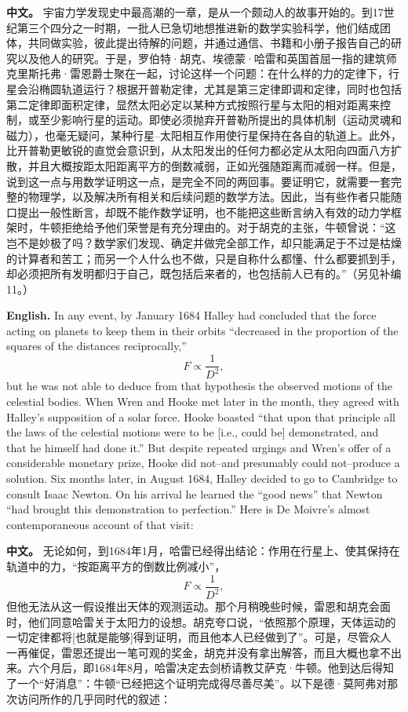 \par\noindent\textbf{中文。} 宇宙力学发现史中最高潮的一章，是从一个颇动人的故事开始的。到17世纪第三个四分之一时期，一批人已急切地想推进新的数学实验科学，他们结成团体，共同做实验，彼此提出待解的问题，并通过通信、书籍和小册子报告自己的研究以及他人的研究。于是，罗伯特·胡克、埃德蒙·哈雷和英国首屈一指的建筑师克里斯托弗·雷恩爵士聚在一起，讨论这样一个问题：在什么样的力的定律下，行星会沿椭圆轨道运行？根据开普勒定律，尤其是第三定律即调和定律，同时也包括第二定律即面积定律，显然太阳必定以某种方式按照行星与太阳的相对距离来控制，或至少影响行星的运动。即使必须抛弃开普勒所提出的具体机制（运动灵魂和磁力），也毫无疑问，某种行星--太阳相互作用使行星保持在各自的轨道上。此外，比开普勒更敏锐的直觉会意识到，从太阳发出的任何力都必定从太阳向四面八方扩散，并且大概按距太阳距离平方的倒数减弱，正如光强随距离而减弱一样。但是，说到这一点与用数学证明这一点，是完全不同的两回事。要证明它，就需要一套完整的物理学，以及解决所有相关和后续问题的数学方法。因此，当有些作者只能随口提出一般性断言，却既不能作数学证明，也不能把这些断言纳入有效的动力学框架时，牛顿拒绝给予他们荣誉是有充分理由的。对于胡克的主张，牛顿曾说：“这岂不是妙极了吗？数学家们发现、确定并做完全部工作，却只能满足于不过是枯燥的计算者和苦工；而另一个人什么也不做，只是自称什么都懂、什么都要抓到手，却必须把所有发明都归于自己，既包括后来者的，也包括前人已有的。”（另见补编11。）
\medskip

\noindent\textbf{English.} In any event, by January 1684 Halley had concluded that the force acting on planets to keep them in their orbits ``decreased in the proportion of the squares of the distances reciprocally,''
\[
F \propto \frac{1}{D^{2}},
\]
but he was not able to deduce from that hypothesis the observed motions of the celestial bodies. When Wren and Hooke met later in the month, they agreed with Halley's supposition of a solar force. Hooke boasted ``that upon that principle all the laws of the celestial motions were to be [i.e., could be] demonstrated, and that he himself had done it.'' But despite repeated urgings and Wren's offer of a considerable monetary prize, Hooke did not--and presumably could not--produce a solution. Six months later, in August 1684, Halley decided to go to Cambridge to consult Isaac Newton. On his arrival he learned the ``good news'' that Newton ``had brought this demonstration to perfection.'' Here is De Moivre's almost contemporaneous account of that visit:
\par\noindent\textbf{中文。} 无论如何，到1684年1月，哈雷已经得出结论：作用在行星上、使其保持在轨道中的力，“按距离平方的倒数比例减小”，
\[
F \propto \frac{1}{D^{2}},
\]
但他无法从这一假设推出天体的观测运动。那个月稍晚些时候，雷恩和胡克会面时，他们同意哈雷关于太阳力的设想。胡克夸口说，“依照那个原理，天体运动的一切定律都将[也就是能够]得到证明，而且他本人已经做到了”。可是，尽管众人一再催促，雷恩还提出一笔可观的奖金，胡克并没有拿出解答，而且大概也拿不出来。六个月后，即1684年8月，哈雷决定去剑桥请教艾萨克·牛顿。他到达后得知了一个“好消息”：牛顿“已经把这个证明完成得尽善尽美”。以下是德·莫阿弗对那次访问所作的几乎同时代的叙述：
\medskip

